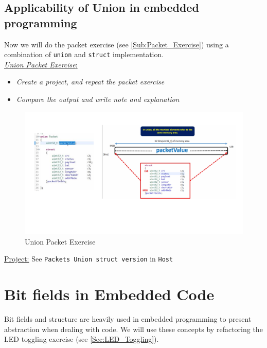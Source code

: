 \subsection{Applicability of Union in embedded programming}

Now we will do the packet exercise (see \ref{Sub:Packet_Exercise}) using a combination of \verb|union| and \verb|struct| implementation.\\

 \underline{\textit{Union Packet Exercise}:}

\begin{itemize}
    \item \textit{Create a project, and repeat the packet exercise} 
    
    \item \textit{Compare the output and write note and explanation} 
\end{itemize}


\begin{figure}[h]
\centering
\includegraphics[scale=0.55]{Figures/Embedded_C/union_packet_exercise}
\caption{Union Packet Exercise}
\label{fig:Embedded_C:union_packet_exercise}
\end{figure}

\underline{Project:} See \verb|Packets Union struct version| in \verb|Host|

\newpage
\section{Bit fields in Embedded Code}

Bit fields and structure are heavily used in embedded programming to present abstraction when dealing with code. We will use these concepts by refactoring the LED toggling exercise (see \autoref{Sec:LED_Toggling}).\\


